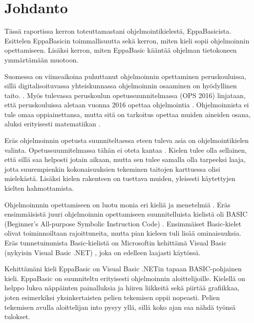 
\section{Johdanto}
Tässä raportissa kerron toteuttamastani
ohjelmointikielestä, EppaBasicista.
Esittelen EppaBasicin toimmallisuutta
sekä kerron, miten kieli sopii
ohjelmoinnin opettamiseen.
Lisäksi kerron, miten EppaBasic
kääntää ohjelman tietokoneen
ymmärtämään muotoon.

Suomessa on viimeaikoina puhuttanut ohjelmoinnin
opettaminen peruskouluissa,
sillä digitalisoituvassa
yhteiskunnassa ohjelmoinnin
osaaminen on hyödyllinen taito.
\cite{hs_kiuru}\cite{hs_eka}.
Myös tulevassa peruskoulun
opetussuunnitelmassa (OPS 2016)
linjataan, että peruskouluissa aletaan
vuonna 2016 opettaa ohjelmointia
\cite{OPS_2016}.
Ohjelmoinnista ei tule omaa oppiainettansa,
mutta sitä on tarkoitus opettaa muiden
aineiden osana, aluksi erityisesti
matematiikan \cite{OPS_2016}\cite{hs_eka}.

Eräs ohjelmoinnin opetusta suunniteltaessa eteen tuleva
asia on ohjelmointikielen valinta.
Opetussuunnitelmassa tähän ei
oteta kantaa \cite{hs_eka}.
Kielen tulee olla sellainen,
että sillä saa helposti jotain aikaan,
mutta sen tulee samalla olla tarpeeksi laaja,
jotta suurempienkin kokonaisuuksien tekeminen
taitojen karttuessa olisi mielekästä.
Lisäksi kielen rakenteen on tuettava muiden,
yleisesti käytettyjen kielten hahmottamista.

Ohjelmoinnnin opettamiseen
on luotu monia eri kieliä ja menetelmiä
\cite{language_history}.
Eräs ensimmäisistä juuri ohjelmoinnin opettamiseen
suunnitelluista kielistä oli BASIC
(Beginner's All-purpose Symbolic Instruction Code)
\cite{basic}.
Ensimmäiset Basic-kielet olivat toiminnoiltaan rajoittuneita,
mutta pian kieleen tuli lisää ominaisuuksia.
Eräs tunnetuimmista Basic-kielistä on
Microsoftin kehittämä Visual Basic
(nykyisin Visual Basic .NET)
\cite{language_history},
joka on edelleen laajasti käytössä.

Kehittämäni kieli EppaBasic
on Visual Basic .NETin tapaan
BASIC-pohjainen kieli.
EppaBasic on suunniteltu
erityisesti ohjelmoinnin aloittelijoille.
Kielellä on helppo lukea
näppäinten painalluksia
ja hiiren liikkeitä
sekä piirtää grafiikkaa,
joten esimerkiksi yksinkertaisten
pelien tekemisen oppii nopeasti.
Pelien tekemisen avulla aloittelijan into pysyy yllä,
sillä koko ajan saa nähdä työnsä tulokset.


